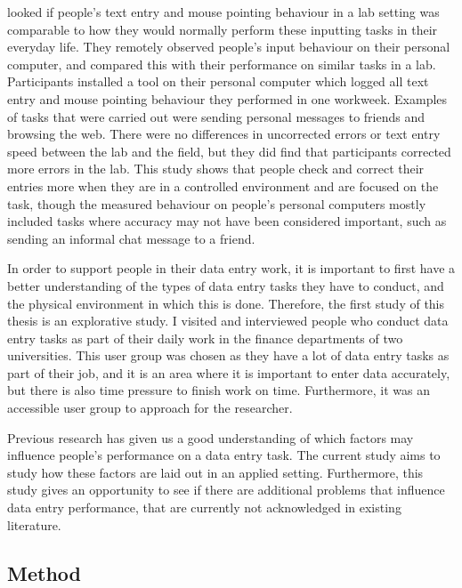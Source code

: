 \citet{Evans2012} looked if people's text entry and mouse pointing behaviour in a lab setting was comparable to how they would normally perform these inputting tasks in their everyday life. They remotely observed people's input behaviour on their personal computer, and compared this with their performance on similar tasks in a lab. Participants installed a tool on their personal computer which logged all text entry and mouse pointing behaviour they performed in one workweek. Examples of tasks that were carried out were sending personal messages to friends and browsing the web. There were no differences in uncorrected errors or text entry speed between the lab and the field, but they did find that participants corrected more errors in the lab. This study shows that people check and correct their entries more when they are in a controlled environment and are focused on the task, though the measured behaviour on people's personal computers mostly included tasks where accuracy may not have been considered important, such as sending an informal chat message to a friend. 

In order to support people in their data entry work, it is important to first have a better understanding of the types of data entry tasks they have to conduct, and the physical environment in which this is done. Therefore, the first study of this thesis is an explorative study. I visited and interviewed people who conduct data entry tasks as part of their daily work in the finance departments of two universities. This user group was chosen as they have a lot of data entry tasks as part of their job, and it is an area where it is important to enter data accurately, but there is also time pressure to finish work on time. Furthermore, it was an accessible user group to approach for the researcher.

Previous research has given us a good understanding of which factors may influence people's performance on a data entry task. The current study aims to study how these factors are laid out in an applied setting. Furthermore, this study gives an opportunity to see if there are additional problems that influence data entry performance, that are currently not acknowledged in existing literature. 

\subsection{Method}
